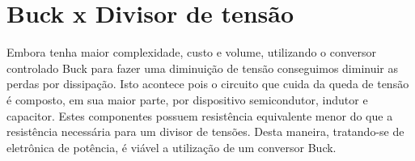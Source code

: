 \documentclass{article}
\begin{document}
\section{Buck x Divisor de tensão}

Embora tenha maior complexidade, custo e volume, utilizando o conversor controlado Buck para fazer uma diminuição de tensão conseguimos diminuir as perdas por dissipação. Isto acontece pois o circuito que cuida da queda de tensão é composto, em sua maior parte, por dispositivo semicondutor, indutor e capacitor. Estes componentes possuem resistência equivalente menor do que a resistência necessária para um divisor de tensões. Desta maneira, tratando-se de eletrônica de potência, é viável a utilização de um conversor Buck.


\end{document}
